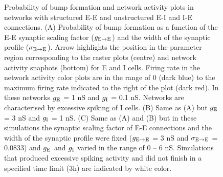 \documentclass[a4paper,12pt]{article}
\newcommand{\ssc}[3]{\ensuremath{#1_{\text{#2}_{\text{#3}}}}}
\newcommand{\gE      }{\ssc{g}      {\scriptsize{E}}{}}
\newcommand{\gI      }{\ssc{g}      {\scriptsize{I}}{}}
\newcommand{\gEE     }{\ssc{g}      {\scriptsize{E}\ensuremath{\rightarrow}\scriptsize{E}}{}}
\newcommand{\sigmaEE }{\ssc{\sigma} {\scriptsize{E}\ensuremath{\rightarrow}\scriptsize{E}}{}}
\begin{document}
\begin{figure}[H]
    \internallinenumbers
    \caption{Probability of bump formation and network activity plots in
    networks with structured E-E and unstructured E-I and I-E connections. (A)
    Probability of bump formation as a function of the E-E synaptic scaling
    factor ($\gEE$) and the width of the synaptic profile ($\sigmaEE$). Arrow
    highlights the position in the parameter region corresponding to the raster
    plots (centre) and network activity snaphots (bottom) for E and I cells.
    Firing rate in the network activity color plots are in the range of 0 (dark
    blue) to the maximum firing rate indicated to the right of the plot (dark
    red). In these networks $\gE$ = 1 nS and $\gI$ = 0.1 nS. Networks are
    characterised by excessive spiking of I cells. (B) Same as (A) but $\gE$ =
    3 nS and $\gI$ = 1 nS. (C) Same as (A) and (B) but in these simulations the
    synaptic scaling factor of E-E connections and the width of the synaptic
    profile were fixed ($\gEE$ = 3 nS and $\sigmaEE$ = 0.0833) and $\gE$ and
    $\gI$ varied in the range of 0 -- 6 nS. Simulations that produced excessive
    spiking activity and did not finish in a specified time limit (3h) are
    indicated by white color.}
\end{figure}

\clearpage
\end{document}
